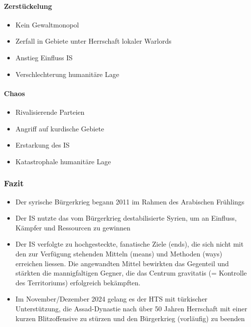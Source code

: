 {}\documentclass[a4paper]{article}
\providecommand{\tightlist}{\setlength{\itemsep}{1mm}\setlength{\parskip}{1mm}}
\begin{document}
\paragraph{Zerstückelung}\label{zerstuxfcckelung}

\begin{itemize}
	\tightlist
	\item
	      Kein Gewaltmonopol
	\item
	      Zerfall in Gebiete unter Herrschaft lokaler Warlords
	\item
	      Anstieg Einfluss IS
	\item
	      Verschlechterung humanitäre Lage
\end{itemize}

\paragraph{Chaos}\label{chaos}

\begin{itemize}
	\tightlist
	\item
	      Rivalisierende Parteien
	\item
	      Angriff auf kurdische Gebiete
	\item
	      Erstarkung des IS
	\item
	      Katastrophale humanitäre Lage
\end{itemize}

\subsubsection{Fazit}\label{fazit-7}

\begin{itemize}
	\tightlist
	\item
	      Der syrische Bürgerkrieg begann 2011 im Rahmen des Arabischen
	      Frühlings
	\item
	      Der IS nutzte das vom Bürgerkrieg destabilisierte Syrien, um an
	      Einfluss, Kämpfer und Ressourcen zu gewinnen
	\item
	      Der IS verfolgte zu hochgesteckte, fanatische Ziele (ends), die sich
	      nicht mit den zur Verfügung stehenden Mitteln (means) und Methoden
	      (ways) erreichen liessen. Die angewandten Mittel bewirkten das
	      Gegenteil und stärkten die mannigfaltigen Gegner, die das Centrum
	      gravitatis (= Kontrolle des Territoriums) erfolgreich bekämpften.
	\item
	      Im November/Dezember 2024 gelang es der HTS mit türkischer
	      Unterstützung, die Assad-Dynastie nach über 50 Jahren Herrschaft mit
	      einer kurzen Blitzoffensive zu stürzen und den Bürgerkrieg (vorläufig)
	      zu beenden
\end{itemize}
\end{document}
